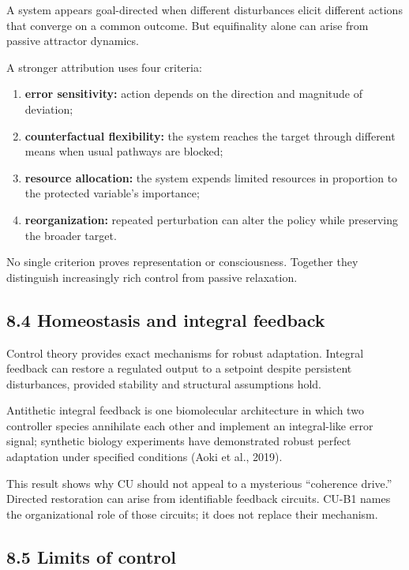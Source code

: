 \documentclass[
  11pt,
]{article}
\providecommand{\tightlist}{%
  \setlength{\itemsep}{0pt}\setlength{\parskip}{0pt}}
\begin{document}
A system appears goal-directed when different disturbances elicit
different actions that converge on a common outcome. But equifinality
alone can arise from passive attractor dynamics.

A stronger attribution uses four criteria:

\begin{enumerate}
\def\labelenumi{\arabic{enumi}.}
\tightlist
\item
  \textbf{error sensitivity:} action depends on the direction and
  magnitude of deviation;
\item
  \textbf{counterfactual flexibility:} the system reaches the target
  through different means when usual pathways are blocked;
\item
  \textbf{resource allocation:} the system expends limited resources in
  proportion to the protected variable's importance;
\item
  \textbf{reorganization:} repeated perturbation can alter the policy
  while preserving the broader target.
\end{enumerate}

No single criterion proves representation or consciousness. Together
they distinguish increasingly rich control from passive relaxation.

\subsection{8.4 Homeostasis and integral
feedback}\label{homeostasis-and-integral-feedback}

Control theory provides exact mechanisms for robust adaptation. Integral
feedback can restore a regulated output to a setpoint despite persistent
disturbances, provided stability and structural assumptions hold.

Antithetic integral feedback is one biomolecular architecture in which
two controller species annihilate each other and implement an
integral-like error signal; synthetic biology experiments have
demonstrated robust perfect adaptation under specified conditions (Aoki
et al., 2019).

This result shows why CU should not appeal to a mysterious ``coherence
drive.'' Directed restoration can arise from identifiable feedback
circuits. CU-B1 names the organizational role of those circuits; it does
not replace their mechanism.

\subsection{8.5 Limits of control}\label{limits-of-control}
\end{document}
